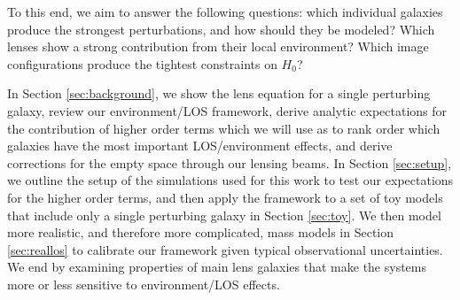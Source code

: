 To this end, we aim to answer the following questions: which individual galaxies produce the strongest perturbations, and how should they be modeled? Which lenses show a strong contribution from their local environment? Which image configurations produce the tightest constraints on $H_0$?

In Section \ref{sec:background}, we show the lens equation for a single perturbing galaxy, review our environment/LOS framework, derive analytic expectations for the contribution of higher order terms which we will use as to rank order which galaxies have the most important LOS/environment effects, and derive corrections for the empty space through our lensing beams. In Section \ref{sec:setup}, we outline the setup of the simulations used for this work to test our expectations for the higher order terms, and then apply the framework to a set of toy models that include only a single perturbing galaxy in Section \ref{sec:toy}. We then model more realistic, and therefore more complicated, mass models in Section \ref{sec:reallos} to calibrate our framework given typical observational uncertainties. We end by examining properties of main lens galaxies that make the systems more or less sensitive to environment/LOS effects.
  